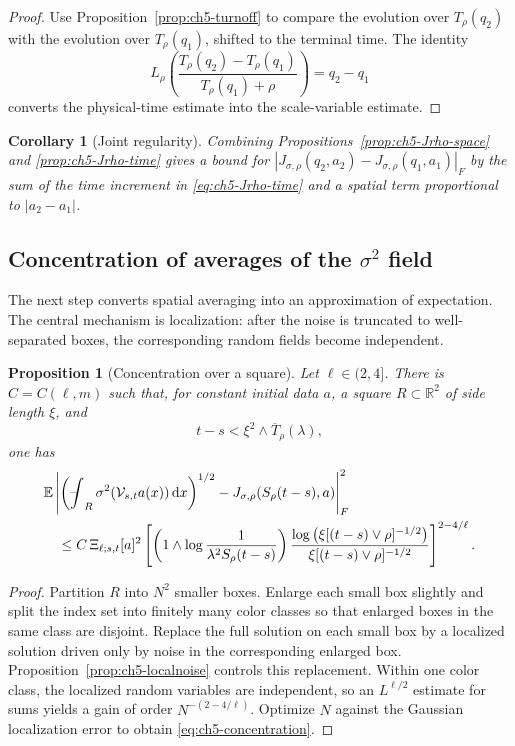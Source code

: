 \documentclass[11pt]{article}
\newtheorem{proposition}[theorem]{Proposition}
\newtheorem{corollary}[theorem]{Corollary}
\theoremstyle{definition}
\theoremstyle{remark}
\newcommand{\R}{\mathbb{R}}
\newcommand{\E}{\mathbb{E}}
\newcommand{\dd}{\,\mathrm{d}}
\newcommand{\avgint}{\mathop{\rlap{\raisebox{.15ex}{--}}\!\int}\nolimits}
\newcommand{\V}{\mathcal{V}}
\newcommand{\Trho}{T_{\rho}}
\newcommand{\Srho}{S_{\rho}}
\newcommand{\Lrho}{L_{\rho}}
\begin{document}
\begin{proof}
Use Proposition~\ref{prop:ch5-turnoff} to compare the evolution over \(\Trho(q_2)\) with the evolution over \(\Trho(q_1)\), shifted to the terminal time. The identity
\[
\Lrho\!\left(\frac{\Trho(q_2)-\Trho(q_1)}{\Trho(q_1)+\rho}\right)=q_2-q_1
\]
converts the physical-time estimate into the scale-variable estimate.
\end{proof}

\begin{corollary}[Joint regularity]\label{cor:ch5-Jrho-joint}
Combining Propositions~\ref{prop:ch5-Jrho-space} and \ref{prop:ch5-Jrho-time} gives a bound for
\(|J_{\sigma,\rho}(q_2,a_2)-J_{\sigma,\rho}(q_1,a_1)|_F\)
by the sum of the time increment in \eqref{eq:ch5-Jrho-time} and a spatial term proportional to \(|a_2-a_1|\).
\end{corollary}

\subsection{Concentration of averages of the \texorpdfstring{$\sigma^2$}{sigma2} field}

The next step converts spatial averaging into an approximation of expectation. The central mechanism is localization: after the noise is truncated to well-separated boxes, the corresponding random fields become independent.

\begin{proposition}[Concentration over a square]\label{prop:ch5-concentration}
Let \(\ell\in(2,4]\). There is \(C=C(\ell,m)\) such that, for constant initial data \(a\), a square \(R\subset\R^2\) of side length \(\xi\), and
\[
t-s<\xi^2\wedge\overline T_{\rho}(\lambda),
\]
one has
\begin{align}\label{eq:ch5-concentration}
&\E\left|
\left(\avgint_R\sigma^2(\V_{s,t}a(x))\dd x\right)^{1/2}
-J_{\sigma,\rho}(\Srho(t-s),a)
\right|_F^2
\\
&\quad\le
C\,\Xi_{\ell;s,t}[a]^2
\left[
\left(1\wedge\log\frac1{\lambda^2\Srho(t-s)}\right)
\frac{\log\left(\xi[(t-s)\vee\rho]^{-1/2}\right)}
{\xi[(t-s)\vee\rho]^{-1/2}}
\right]^{2-4/\ell}.
\end{align}
\end{proposition}

\begin{proof}
Partition \(R\) into \(N^2\) smaller boxes. Enlarge each small box slightly and split the index set into finitely many color classes so that enlarged boxes in the same class are disjoint. Replace the full solution on each small box by a localized solution driven only by noise in the corresponding enlarged box. Proposition~\ref{prop:ch5-localnoise} controls this replacement. Within one color class, the localized random variables are independent, so an \(L^{\ell/2}\) estimate for sums yields a gain of order \(N^{-(2-4/\ell)}\). Optimize \(N\) against the Gaussian localization error to obtain \eqref{eq:ch5-concentration}.
\end{proof}
\end{document}
